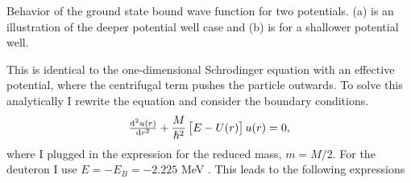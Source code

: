 \begin{marginfigure}
\caption{Behavior of the ground state bound wave function for two potentials. (a) is an illustration of the deeper potential well case and (b) is for a shallower potential well. }
  \end{marginfigure}
  This is identical to the one-dimensional Schrodinger equation with an effective potential, where the centrifugal term pushes the particle outwards. To solve this analytically I rewrite the equation and consider the boundary conditions.
\begin{equation} \label{SEnew}
  \od[2]{u(r)}{r}+\frac{M}{\hbar^2} \left[E-U(r) \right]u(r)=0,
\end{equation}
where I plugged in the expression for the reduced mass, $m=M/2$. For the deuteron I use $E=-E_B = -2.225$ MeV \cite[p. 51]{KerneII}. This leads to the following expressions

